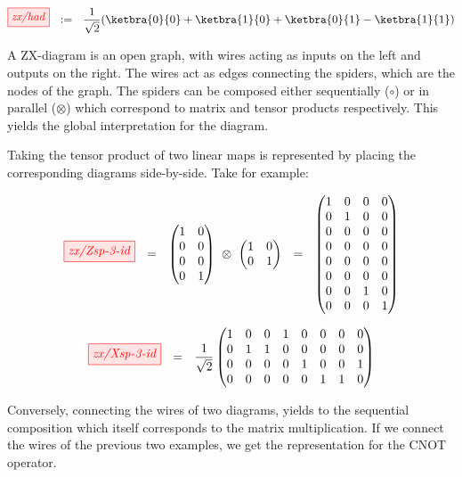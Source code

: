 \begin{equation*}
\tikzfig{zx/had} \ \ :=\ \ \frac{1}{\sqrt{2}} (\ketbra{0}{0}+\ketbra{1}{0}+\ketbra{0}{1}-\ketbra{1}{1})
\end{equation*}

A ZX-diagram is an open graph, with wires acting as inputs on the left and outputs on
the right. The wires act as edges connecting the spiders, which are the nodes of the
graph. The spiders can be composed either sequentially ($\circ$) or in parallel
($\otimes$) which correspond to matrix and tensor products respectively. This yields
the global interpretation for the diagram. 

Taking the tensor product of two linear maps is represented by placing the
corresponding diagrams side-by-side. Take for example:

\begin{equation*}
    \tikzfig{zx/Zsp-3-id}\ \ = \ \ \begin{pmatrix}1&0\\0&0\\0&0\\0&1\end{pmatrix}\ \otimes\ \begin{pmatrix}1&0\\0&1\end{pmatrix} \ \ 
    = \ \ \begin{pmatrix}1&0&0&0\\0&1&0&0\\0&0&0&0\\0&0&0&0\\0&0&0&0\\0&0&0&0\\0&0&1&0\\0&0&0&1\end{pmatrix}
\end{equation*}

\begin{equation*}
    \tikzfig{zx/Xsp-3-id}\ \ = \ \ \frac{1}{\sqrt{2}}\begin{pmatrix}1&0&0&1&0&0&0&0\\0&1&1&0&0&0&0&0\\0&0&0&0&1&0&0&1\\0&0&0&0&0&1&1&0\end{pmatrix}
\end{equation*}

Conversely, connecting the wires of two diagrams, yields to the sequential
composition which itself corresponds to the matrix multiplication. If we connect
the wires of the previous two examples, we get the representation for the CNOT
operator.

